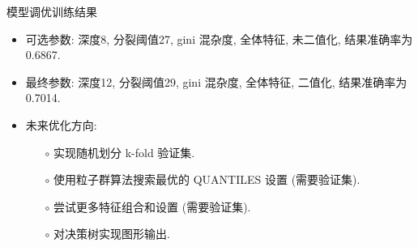 \begin{frame}{模型调优}{训练结果}

\vspace{-0.2cm}

\begin{itemize}
\item 可选参数: 深度8, 分裂阈值27, gini 混杂度, 全体特征, 未二值化, 结果准确率为 0.6867.

\vspace{-0.1cm}
\item 最终参数: 深度12, 分裂阈值29, gini 混杂度, 全体特征, 二值化, 结果准确率为 0.7014.
\end{itemize}

\begin{figure}[bth]
\end{figure}

\begin{itemize}
\item 未来优化方向:
\begin{itemize}\setlength{\itemindent}{-1em}
\item[$\circ$] 实现随机划分 k-fold 验证集.
\item[$\circ$] 使用粒子群算法搜索最优的 QUANTILES 设置 (需要验证集).
\item[$\circ$] 尝试更多特征组合和设置 (需要验证集).
\item[$\circ$] 对决策树实现图形输出.
\end{itemize}
\end{itemize}
\end{frame}







